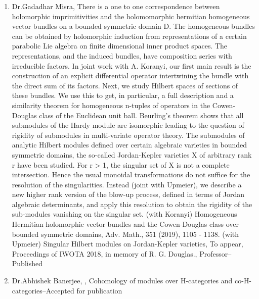 \begin{enumerate}
\item Dr.Gadadhar Misra, There is a one to one correspondence between holomorphic imprimitivities and the holomomorphic hermitian homogeneous vector bundles on a bounded symmetric domain D. The homogeneous bundles can be obtained by holomorphic induction from representations of a certain parabolic Lie algebra on finite dimensional inner product spaces. The representations, and the induced bundles, have composition series with irreducible factors. In joint work with A. Koranyi, our first main result is the construction of an explicit differential operator intertwining the bundle with the direct sum of its factors. Next, we study Hilbert spaces of sections of these bundles. We use this to get, in particular, a full description and a similarity theorem for homogeneous n-tuples of operators in the Cowen-Douglas class of the Euclidean unit ball.   Beurling’s theorem shows that all submodules of the Hardy module are isomorphic leading to the question of rigidity of submodules in multi-variate operator theory. The submodules of analytic Hilbert modules defined over certain algebraic varieties in bounded symmetric domains, the so-called Jordan-Kepler varieties X of arbitrary rank r have been studied. For r > 1, the singular set of X is not a complete intersection. Hence the usual monoidal transformations do not suffice for the resolution of the singularities. Instead (joint with Upmeier), we describe a new higher rank version of the blow-up process, defined in terms of Jordan algebraic determinants, and apply this resolution to obtain the rigidity of the sub-modules vanishing on the singular set.   (with Koranyi) Homogeneous Hermitian holomorphic vector bundles and the Cowen-Douglas class over bounded symmetric domains, Adv. Math., 351 (2019), 1105 - 1138.  (with Upmeier)  Singular Hilbert modules on Jordan-Kepler varieties, To appear, Proceedings of IWOTA 2018, in memory of R. G. Douglas., Professor--Published
\item Dr.Abhishek Banerjee, , Cohomology of modules over H-categories and co-H-categories--Accepted for publication
\end{enumerate}

